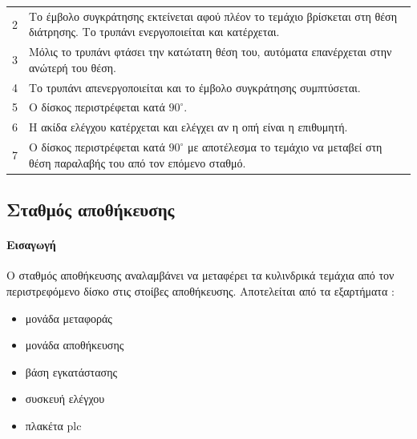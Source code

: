 \documentclass[a4paper,12pt,twoside]{report}
\begin{document}
\begin{longtable} { m{0.5cm} m{12cm} }
					2 & Το έμβολο συγκράτησης εκτείνεται αφού πλέον το τεμάχιο βρίσκεται στη θέση διάτρησης. Το τρυπάνι ενεργοποιείται και κατέρχεται.\\
					3 & Μόλις το τρυπάνι φτάσει την κατώτατη θέση του, αυτόματα επανέρχεται στην ανώτερή του θέση.\\
					4 & Το τρυπάνι απενεργοποιείται και το έμβολο συγκράτησης συμπτύσεται.\\
					5 & Ο δίσκος περιστρέφεται κατά $90^{\circ}$.\\
					6 & Η ακίδα ελέγχου κατέρχεται και ελέγχει αν η οπή είναι η επιθυμητή.\\
					7 & Ο δίσκος περιστρέφεται κατά $90^{\circ}$ με αποτέλεσμα το τεμάχιο να μεταβεί στη θέση παραλαβής του από τον επόμενο σταθμό.\\
					\hline
				\end{longtable}

			\FloatBarrier
			\subsection{Σταθμός αποθήκευσης \cite{FestoMPSHandlingStationManual} \cite{ΤοΦυσικόΣύστημαFestoMPS} \cite{UMLΕνσωματωμέναΣυστήματα}}
			
			\label{ενότ:Σταθμός αποθήκευσης}
				\paragraph{Εισαγωγή} {Ο σταθμός αποθήκευσης αναλαμβάνει να μεταφέρει τα κυλινδρικά τεμάχια από τον περιστρεφόμενο δίσκο στις στοίβες αποθήκευσης. Αποτελείται από τα εξαρτήματα :
				}
				\begin{itemize}
					\item μονάδα μεταφοράς
					\item μονάδα αποθήκευσης
					\item βάση εγκατάστασης
					\item συσκευή ελέγχου
					\item πλακέτα plc
				\end{itemize}
\end{document}
